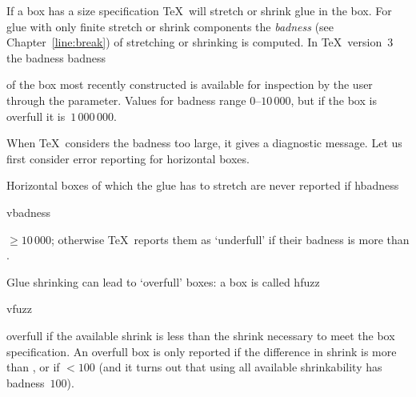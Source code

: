 \documentclass{book}
\begin{document}
If a box has a  size specification \TeX\ will
stretch or shrink glue in the box. For glue with
only finite stretch or shrink components the {\em badness\/}
(see Chapter~\ref{line:break}) of stretching or shrinking
is computed.
In \TeX\ version~3 the badness
\cstoidx badness\par
{}
of the box most recently
constructed is available for inspection
by the user through the  parameter. Values for
badness range 0--$10\,000$, but if the box is overfull
it is~$1\,000\,000$.

When \TeX\ considers the badness too large,
it gives a diagnostic message. Let us first consider error reporting
for horizontal boxes.

Horizontal boxes of which the glue has to stretch are never reported if
\cstoidx hbadness\par\cstoidx vbadness\par
{}${}\geq10\,000$; otherwise \TeX\ reports them
as `underfull' if their badness is more than .

Glue shrinking can lead to `overfull' boxes: a box is called
\cstoidx hfuzz\par\cstoidx vfuzz\par
overfull if the available shrink is less than the shrink
necessary to meet the box specification. An overfull box
is only reported if the difference in shrink is more than
, or if ${}<100$ (and it turns out that
using all available shrinkability has badness~$100$).
\end{document}
